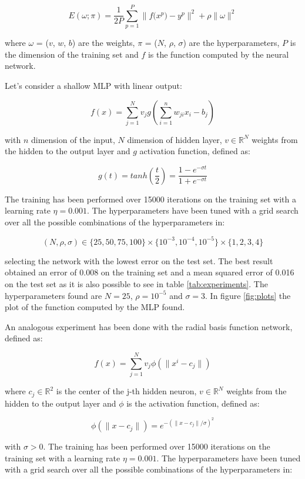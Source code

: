 \documentclass[a4paper]{article}
\numberwithin{equation}{section} %
\numberwithin{figure}{section} %
\numberwithin{table}{section} %
\theoremstyle{definition}
\begin{document}
\begin{equation}
  \label{eq:training-error}
  E(\omega; \pi) = \frac{1}{2P} \displaystyle\sum_{p=1}^{P} \| f\big(x^p\big) - y^p \|^2 + \rho \| \omega \|^2
\end{equation}

\noindent where $\omega$ = ($v$, $w$, $b$) are the weights,
$\pi$ = ($N$, $\rho$, $\sigma$) are the hyperparameters, $P$ is the dimension
of the training set and $f$ is the function computed by the neural network.

Let's consider a shallow MLP with linear output:

\[ f(x) = \displaystyle\sum_{j=1}^{N} v_j g\left(\displaystyle\sum_{i=1}^{n}w_{ji}x_i - b_j\right) \]

\noindent with $n$ dimension of the input, $N$ dimension of hidden layer, $v \in \mathbb{R}^N$
weights from the hidden to the output layer and
$g$ activation function, defined as:

\[ g(t) = tanh\left(\frac{t}{2}\right) = \frac{1-e^{-\sigma t}}{1+e^{-\sigma t}} \]

The training has been performed over 15000 iterations on the training set with
a learning rate $\eta = 0.001$. The hyperparameters have been tuned with a
grid search over all the possible combinations of the hyperparameters in:

\[ (N, \rho, \sigma) \in \Big\{25, 50, 75, 100\Big\} \times \Big\{10^{-3}, 10^{-4}, 10^{-5}\Big\}
\times \Big\{1, 2, 3, 4\Big\} \]

\noindent selecting the network with the lowest error on the test set.
The best result obtained an error of 0.008 on the training set and a mean squared error of
0.016 on the test set as it is also possible to see in table \ref{tab:experiments}.
The hyperparameters found are $N=25$, $\rho=10^{-5}$ and $\sigma=3$. In figure \ref{fig:plots}
the plot of the function computed by the MLP found.

An analogous experiment has been done with the radial basis function network,
defined as:

\[ f(x) = \displaystyle\sum_{j=1}^{N} v_j \phi(\| x^i - c_j \|) \]

where $c_j \in \mathbb{R}^2$ is the center of the j-th hidden neuron,
$v \in \mathbb{R}^N$ weights from the hidden to the output layer and $\phi$
is the activation function, defined as:

\[ \phi(\|x - c_j\|) = e^{-(\| x - c_j \|/\sigma)^2} \]

\noindent with $\sigma > 0$.
The training has been performed over 15000 iterations on the training set with
a learning rate $\eta = 0.001$. The hyperparameters have been tuned with a
grid search over all the possible combinations of the hyperparameters in:
\end{document}
